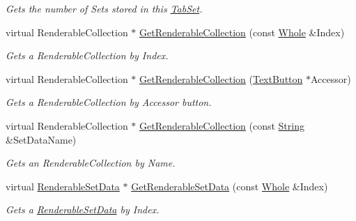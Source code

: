 \begin{DoxyCompactItemize}
\begin{DoxyCompactList}\small\item\em Gets the number of Sets stored in this \hyperlink{classMezzanine_1_1UI_1_1TabSet}{TabSet}. \item\end{DoxyCompactList}\item 
virtual RenderableCollection $\ast$ \hyperlink{classMezzanine_1_1UI_1_1TabSet_ad0ae1d3d1f180e4a4df5f590b98f1055}{GetRenderableCollection} (const \hyperlink{namespaceMezzanine_adcbb6ce6d1eb4379d109e51171e2e493}{Whole} \&Index)
\begin{DoxyCompactList}\small\item\em Gets a RenderableCollection by Index. \item\end{DoxyCompactList}\item 
virtual RenderableCollection $\ast$ \hyperlink{classMezzanine_1_1UI_1_1TabSet_a50e0f42e0400ea33dfb67a39bd296ed4}{GetRenderableCollection} (\hyperlink{classMezzanine_1_1UI_1_1TextButton}{TextButton} $\ast$Accessor)
\begin{DoxyCompactList}\small\item\em Gets a RenderableCollection by Accessor button. \item\end{DoxyCompactList}\item 
virtual RenderableCollection $\ast$ \hyperlink{classMezzanine_1_1UI_1_1TabSet_a44e57083881081eacfe86e2cf238fbc1}{GetRenderableCollection} (const \hyperlink{namespaceMezzanine_acf9fcc130e6ebf08e3d8491aebcf1c86}{String} \&SetDataName)
\begin{DoxyCompactList}\small\item\em Gets an RenderableCollection by Name. \item\end{DoxyCompactList}\item 
virtual \hyperlink{structMezzanine_1_1UI_1_1RenderableSetData}{RenderableSetData} $\ast$ \hyperlink{classMezzanine_1_1UI_1_1TabSet_adbefc53cf485e2d4c937c9f08c13958e}{GetRenderableSetData} (const \hyperlink{namespaceMezzanine_adcbb6ce6d1eb4379d109e51171e2e493}{Whole} \&Index)
\begin{DoxyCompactList}\small\item\em Gets a \hyperlink{structMezzanine_1_1UI_1_1RenderableSetData}{RenderableSetData} by Index. \item\end{DoxyCompactList}\item 

\end{DoxyCompactItemize}
